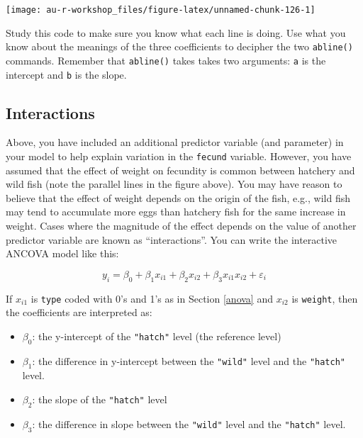 \documentclass[]{book}
\providecommand{\tightlist}{%
  \setlength{\itemsep}{0pt}\setlength{\parskip}{0pt}}
\begin{document}
\begin{center}\texttt{[image: au-r-workshop\_files/figure-latex/unnamed-chunk-126-1]} \end{center}

Study this code to make sure you know what each line is doing. Use what you know about the meanings of the three coefficients to decipher the two \texttt{abline()} commands. Remember that \texttt{abline()} takes takes two arguments: \texttt{a} is the intercept and \texttt{b} is the slope.

\hypertarget{interactions}{%
\subsection{Interactions}\label{interactions}}

Above, you have included an additional predictor variable (and parameter) in your model to help explain variation in the \texttt{fecund} variable. However, you have assumed that the effect of weight on fecundity is common between hatchery and wild fish (note the parallel lines in the figure above). You may have reason to believe that the effect of weight depends on the origin of the fish, e.g., wild fish may tend to accumulate more eggs than hatchery fish for the same increase in weight. Cases where the magnitude of the effect depends on the value of another predictor variable are known as ``interactions''. You can write the interactive ANCOVA model like this:

\begin{equation}
  y_i=\beta_0 + \beta_1 x_{i1} + \beta_2 x_{i2} + \beta_3 x_{i1} x_{i2} + \varepsilon_i
\label{eq:ancova-interact}
\end{equation}

If \(x_{i1}\) is \texttt{type} coded with 0's and 1's as in Section \ref{anova} and \(x_{i2}\) is \texttt{weight}, then the coefficients are interpreted as:

\begin{itemize}
\tightlist
\item
  \(\beta_0\): the y-intercept of the \texttt{"hatch"} level (the reference level)
\item
  \(\beta_1\): the difference in y-intercept between the \texttt{"wild"} level and the \texttt{"hatch"} level.
\item
  \(\beta_2\): the slope of the \texttt{"hatch"} level
\item
  \(\beta_3\): the difference in slope between the \texttt{"wild"} level and the \texttt{"hatch"} level.
\end{itemize}
\end{document}
